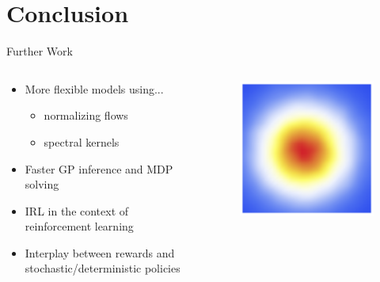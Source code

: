 \documentclass{beamer}
\begin{document}
\section{Conclusion}

\begin{frame}{Further Work}
  \begin{minipage}[t]{\textwidth}
    \begin{columns}[t]
      \begin{column}{0.9\textwidth}
        \begin{itemize}
        \item More flexible models using...
          \begin{itemize}
          \item normalizing flows
          \item spectral kernels
          \end{itemize}
        \item Faster GP inference and MDP solving
        \item IRL in the context of reinforcement learning
        \item Interplay between rewards and stochastic/deterministic policies
        \end{itemize}
        \vspace{1.5cm}
      \end{column}
      \begin{column}{0.1\textwidth}
        \vspace{-1cm}
        \begin{figure}
          \centering
          \includegraphics[scale=0.1]{images/flows-1.png}


\end{figure}
\end{column}
\end{columns}
\end{minipage}
\end{frame}
\end{document}
